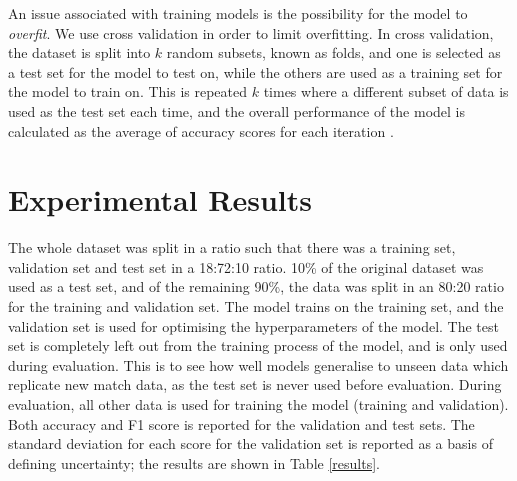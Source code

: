 An issue associated with training models is the possibility for the model to \textit{overfit}. We use cross validation in order to limit overfitting.
In cross validation, the dataset is split into $k$ random subsets, known as folds, and one is selected as a test set for the model to test on, while the others are used as a training set for the model to train on. This is repeated $k$ times where a different subset of data is used as the test set each time, and the overall performance of the model is calculated as the average of accuracy scores for each iteration \cite{berrar2019cross}.

\section{Experimental Results} \label{experresults}
The whole dataset was split in a ratio such that there was a training set, validation set and test set in a 18:72:10 ratio. 10\% of the original dataset was used as a test set, and of the remaining 90\%, the data was split in an 80:20 ratio for the training and validation set.
The model trains on the training set, and the validation set is used for optimising the hyperparameters of the model.
The test set is completely left out from the training process of the model, and is only used during evaluation. This is to see how well models generalise to unseen data which replicate new match data, as the test set is never used before evaluation. During evaluation, all other data is used for training the model (training and validation).
Both accuracy and F1 score is reported for the validation and test sets. The standard deviation for each score for the validation set is reported as a basis of defining uncertainty; the results are shown in Table \ref{results}.

